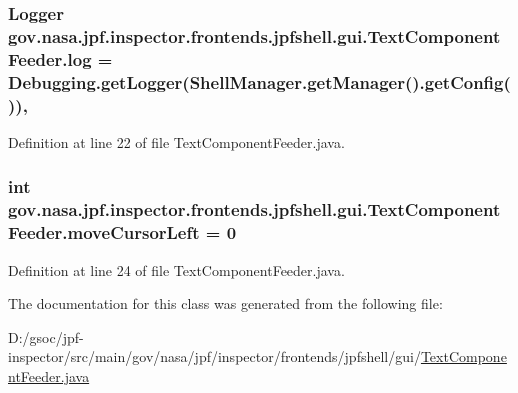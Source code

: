 \subsubsection[{\texorpdfstring{log}{log}}]{\setlength{\rightskip}{0pt plus 5cm}Logger gov.\+nasa.\+jpf.\+inspector.\+frontends.\+jpfshell.\+gui.\+Text\+Component\+Feeder.\+log = {\bf Debugging.\+get\+Logger}(Shell\+Manager.\+get\+Manager().get\+Config())\hspace{0.3cm}{\ttfamily [static]}, {\ttfamily [private]}}\hypertarget{classgov_1_1nasa_1_1jpf_1_1inspector_1_1frontends_1_1jpfshell_1_1gui_1_1_text_component_feeder_abd9a7fdd560d87f20caa912ed849ef72}{}\label{classgov_1_1nasa_1_1jpf_1_1inspector_1_1frontends_1_1jpfshell_1_1gui_1_1_text_component_feeder_abd9a7fdd560d87f20caa912ed849ef72}


Definition at line 22 of file Text\+Component\+Feeder.\+java.

\subsubsection[{\texorpdfstring{move\+Cursor\+Left}{moveCursorLeft}}]{\setlength{\rightskip}{0pt plus 5cm}int gov.\+nasa.\+jpf.\+inspector.\+frontends.\+jpfshell.\+gui.\+Text\+Component\+Feeder.\+move\+Cursor\+Left = 0\hspace{0.3cm}{\ttfamily [private]}}\hypertarget{classgov_1_1nasa_1_1jpf_1_1inspector_1_1frontends_1_1jpfshell_1_1gui_1_1_text_component_feeder_ae2835ec22871ca52247fb80fbdfd95c0}{}\label{classgov_1_1nasa_1_1jpf_1_1inspector_1_1frontends_1_1jpfshell_1_1gui_1_1_text_component_feeder_ae2835ec22871ca52247fb80fbdfd95c0}


Definition at line 24 of file Text\+Component\+Feeder.\+java.



The documentation for this class was generated from the following file\+:\begin{DoxyCompactItemize}
\item 
D\+:/gsoc/jpf-\/inspector/src/main/gov/nasa/jpf/inspector/frontends/jpfshell/gui/\hyperlink{_text_component_feeder_8java}{Text\+Component\+Feeder.\+java}\end{DoxyCompactItemize}
